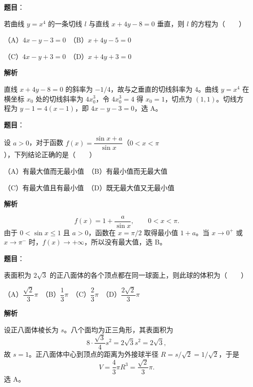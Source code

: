 \begin{answer}

\textbf{题目}：

若曲线 $y=x^4$ 的一条切线 $l$ 与直线 $x+4y-8=0$ 垂直，则 $l$ 的方程为\mbox{（　　）}

（A）$4x-y-3=0$　（B）$x+4y-5=0$

（C）$4x-y+3=0$　（D）$x+4y+3=0$

\textbf{解析}

直线 $x+4y-8=0$ 的斜率为 $-1/4$，故与之垂直的切线斜率为 $4$。曲线 $y=x^4$ 在横坐标 $x_0$ 处的切线斜率为 $4x_0^3$，令 $4x_0^3=4$ 得 $x_0=1$，切点为 $(1,1)$。切线方程为 $y-1=4(x-1)$，即 $4x-y-3=0$，选 A。


\end{answer}
\begin{answer}

\textbf{题目}：

设 $a>0$，对于函数 $f(x)=\dfrac{\sin x+a}{\sin x}$（$0<x<\pi$），下列结论正确的是\mbox{（　　）}

（A）有最大值而无最小值　（B）有最小值而无最大值

（C）有最大值且有最小值　（D）既无最大值又无最小值

\textbf{解析}

\nopagebreak[4]
\[
f(x)=1+\frac{a}{\sin x},\qquad 0<x<\pi.
\]
由于 $0<\sin x\le1$ 且 $a>0$，函数在 $x=\pi/2$ 取得最小值 $1+a$。当 $x\to0^+$ 或 $x\to\pi^-$ 时，$f(x)\to+\infty$，所以没有最大值，选 B。


\end{answer}
\begin{answer}

\textbf{题目}：

表面积为 $2\sqrt{3}$ 的正八面体的各个顶点都在同一球面上，则此球的体积为\mbox{（　　）}

（A）$\dfrac{\sqrt{2}}{3}\pi$　（B）$\dfrac{1}{3}\pi$　（C）$\dfrac{2}{3}\pi$　（D）$\dfrac{2\sqrt{2}}{3}\pi$

\textbf{解析}

设正八面体棱长为 $s$。八个面均为正三角形，其表面积为
\nopagebreak[4]
\[
8\cdot\frac{\sqrt3}{4}s^2=2\sqrt3s^2=2\sqrt3,
\]
故 $s=1$。正八面体中心到顶点的距离为外接球半径 $R=s/\sqrt2=1/\sqrt2$，于是
\nopagebreak[4]
\[
V=\frac43\pi R^3=\frac{\sqrt2}{3}\pi.
\]
选 A。


\end{answer}
